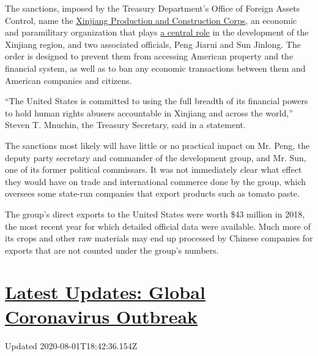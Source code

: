 The sanctions, imposed by the Treasury Department's Office of Foreign
Assets Control, name the
\href{https://www.nytimes.com/2009/08/07/world/asia/07xinjiang.html}{Xinjiang
Production and Construction Corps}, an economic and paramilitary
organization that plays
\href{https://www.andrewerickson.com/2019/11/the-xinjiang-production-construction-corps-key-policy-tool-from-mao-to-xi/}{a
central role} in the development of the Xinjiang region, and two
associated officials, Peng Jiarui and Sun Jinlong. The order is designed
to prevent them from accessing American property and the financial
system, as well as to ban any economic transactions between them and
American companies and citizens.

``The United States is committed to using the full breadth of its
financial powers to hold human rights abusers accountable in Xinjiang
and across the world,'' Steven T. Mnuchin, the Treasury Secretary, said
in a statement.

The sanctions most likely will have little or no practical impact on Mr.
Peng, the deputy party secretary and commander of the development group,
and Mr. Sun, one of its former political commissars. It was not
immediately clear what effect they would have on trade and international
commerce done by the group, which oversees some state-run companies that
export products such as tomato paste.

The group's direct exports to the United States were worth \$43 million
in 2018, the most recent year for which detailed official data were
available. Much more of its crops and other raw materials may end up
processed by Chinese companies for exports that are not counted under
the group's numbers.

\hypertarget{latest-updates-global-coronavirus-outbreak}{%
\section{\texorpdfstring{\href{https://www.nytimes.com/2020/08/01/world/coronavirus-covid-19.html?action=click\&pgtype=Article\&state=default\&region=MAIN_CONTENT_1\&context=storylines_live_updates}{Latest
Updates: Global Coronavirus
Outbreak}}{Latest Updates: Global Coronavirus Outbreak}}\label{latest-updates-global-coronavirus-outbreak}}

Updated 2020-08-01T18:42:36.154Z

